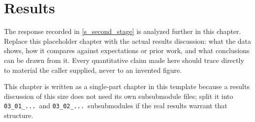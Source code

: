 \chapter{Results}%
\label{s_results}

The response recorded in \cref{s_second_stage} is analyzed further in
this chapter. Replace this placeholder chapter with the actual results
discussion: what the data shows, how it compares against expectations or
prior work, and what conclusions can be drawn from it. Every quantitative
claim made here should trace directly to material the caller supplied,
never to an invented figure.

This chapter is written as a single-part chapter in this template
because a results discussion of this size does not need its own
subsubmodule files; split it into \texttt{03\_01\_...}\ and
\texttt{03\_02\_...}\ subsubmodules if the real results warrant that
structure.
